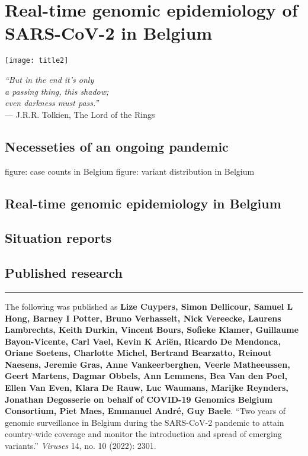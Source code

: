 \chapter{Real-time genomic epidemiology of SARS-CoV-2 in Belgium}\label{ch:chapter1}

\begin{minipage}[b]{0.6\textwidth}
    \texttt{[image: title2]} %
  \end{minipage}
  \hfill
  \begin{minipage}[b]{0.35\textwidth}
    \footnotesize
    \begin{flushright}
      \textit{``But in the end it's only\\a passing thing, this shadow;\\even darkness must pass.''} \\
      --- J.R.R.
Tolkien, The Lord of the Rings
    \end{flushright}
    \vspace{2cm}
\end{minipage}
  
\clearpage

\onehalfspacing


\section{Necesseties of an ongoing pandemic}
figure: case counts in Belgium
figure: variant distribution in Belgium

\section{Real-time genomic epidemiology in Belgium}

\section{Situation reports}

\section{Published research}

\singlespacing

\hrule
\vspace*{12pt}
The following was published as \textbf{Lize Cuypers, Simon Dellicour, Samuel L Hong, Barney I Potter, Bruno Verhasselt, Nick Vereecke, Laurens Lambrechts, Keith Durkin, Vincent Bours, Sofieke Klamer, Guillaume Bayon-Vicente, Carl Vael, Kevin K Ari\"{e}n, Ricardo De Mendonca, Oriane Soetens, Charlotte Michel, Bertrand Bearzatto, Reinout Naesens, Jeremie Gras, Anne Vankeerberghen, Veerle Matheeussen, Geert Martens, Dagmar Obbels, Ann Lemmens, Bea Van den Poel, Ellen Van Even, Klara De Rauw, Luc Waumans, Marijke Reynders, Jonathan Degosserie on behalf of COVID-19 Genomics Belgium Consortium, Piet Maes, Emmanuel Andr\'{e}, Guy Baele}.
``Two years of genomic surveillance in Belgium during the SARS-CoV-2 pandemic to attain country-wide coverage and monitor the introduction and spread of emerging variants.'' \textit{Viruses} 14, no.
10 (2022): 2301.

